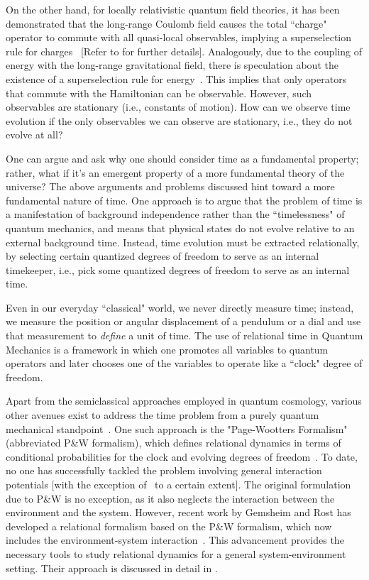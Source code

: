 On the other hand, for locally relativistic quantum field theories, it has been demonstrated that the 
long-range Coulomb field causes the total ``charge" operator to commute with all quasi-local observables, 
implying a superselection rule for charges~\cite{Strocchi:1974xh} [Refer to  
for further details]. Analogously, due to the coupling of energy with the long-range gravitational 
field, there is speculation about the existence of a superselection rule for energy~\cite{page1983evolution}. 
This implies that only operators that commute with the Hamiltonian can be observable. However, such 
observables are stationary (i.e., constants of motion). How can we observe time evolution if the 
only observables we can observe are stationary, i.e., they do not evolve at all?

One can argue and ask why one should consider time as a fundamental property; rather, what if 
it's an emergent property of a more fundamental theory of the universe? The above arguments and 
problems discussed hint toward a more fundamental nature of time. One approach is to argue that 
the problem of time is a manifestation of background independence rather than the ``timelessness" 
of quantum mechanics, and means that physical states do not evolve relative to an external background 
time. Instead, time evolution must be extracted relationally, by selecting certain quantized degrees 
of freedom to serve as an internal timekeeper, i.e., pick some quantized degrees of freedom to serve 
as an internal time.

Even in our everyday ``classical" world, we never directly measure time; instead, we measure the 
position or angular displacement of a pendulum or a dial and use that measurement to \emph{define} a 
unit of time. The use of relational time in Quantum Mechanics is a framework in which one promotes 
all variables to quantum operators and later chooses one of the variables to operate like a    
``clock" degree of freedom.

Apart from the semiclassical approaches employed in quantum cosmology, various other avenues 
exist to address the time problem from a purely quantum mechanical standpoint~\cite{hohn2021trinity}. 
One such approach is the "Page-Wootters Formalism" (abbreviated P\&W formalism), which defines 
relational dynamics in terms of conditional probabilities for the clock and evolving degrees of 
freedom~\cite{page1983evolution}. To date, no one has successfully tackled the problem involving 
general interaction potentials [with the exception of~\cite{Smith:2017pwx} to a certain extent]. 
The original formulation due to P\&W is no exception, as it also neglects the interaction between 
the environment and the system. However, recent work by Gemsheim and Rost has developed a relational 
formalism based on the P\&W formalism, which now includes the environment-system 
interaction~\cite{Gemsheim:2023izg}. This advancement provides the necessary tools to study 
relational dynamics for a general system-environment setting. Their approach is discussed in 
detail in .

